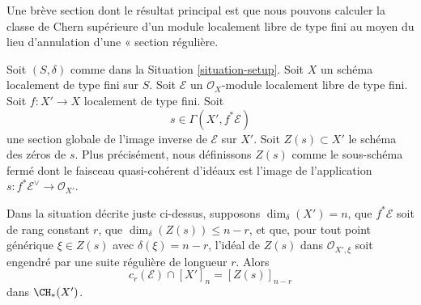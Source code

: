 \noindent
Une brève section dont le résultat principal est que nous pouvons calculer la
classe de Chern supérieure d'un module localement libre de type fini au moyen du
lieu d'annulation d'une « section régulière.

\medskip\noindent
Soit $(S, \delta)$ comme dans la Situation \ref{situation-setup}. Soit $X$ un schéma
localement de type fini sur $S$. Soit $\mathcal{E}$ un
$\mathcal{O}_X$-module localement libre de type fini. Soit $f : X' \to X$ localement de type fini. Soit
$$
s \in \Gamma(X', f^*\mathcal{E})
$$
une section globale de l'image inverse de $\mathcal{E}$ sur $X'$. Soit
$Z(s) \subset X'$ le schéma des zéros de $s$. Plus précisément, nous définissons
$Z(s)$ comme le sous-schéma fermé dont le faisceau quasi-cohérent
d'idéaux est l'image de l'application
$s : f^*\mathcal{E}^\vee \to \mathcal{O}_{X'}$.

\begin{lemma}
\label{lemma-top-chern-class}
Dans la situation décrite juste ci-dessus, supposons $\dim_\delta(X') = n$,
que $f^*\mathcal{E}$ soit de rang constant $r$, que
$\dim_\delta(Z(s)) \leq n - r$, et que, pour tout point générique
$\xi \in Z(s)$ avec $\delta(\xi) = n - r$, l'idéal de $Z(s)$
dans $\mathcal{O}_{X', \xi}$ soit engendré par une suite régulière
de longueur $r$. Alors
$$
c_r(\mathcal{E}) \cap [X']_n = [Z(s)]_{n - r}
$$
dans $\CH_*(X')$.
\end{lemma}

